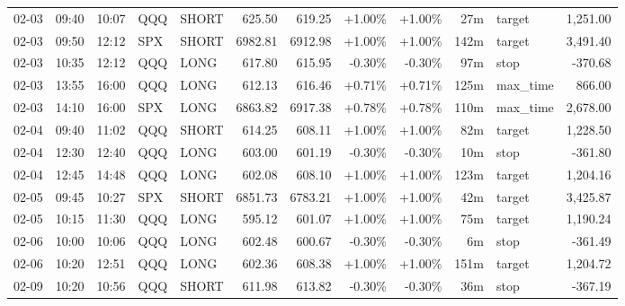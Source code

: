 \documentclass[11pt,a4paper,twoside]{article}
\begin{document}
\begin{center}
\begin{longtable}{>{\color{txtmain}}l l l l l r r r r r >{\color{txtmain}}l r}
02-03 & 09:40 & 10:07 & QQQ & SHORT & 625.50 & 619.25 & \textcolor{wingreen}{+1.00\%} & \textcolor{wingreen}{+1.00\%} & 27m & target & \textcolor{wingreen}{1,251.00} \\
02-03 & 09:50 & 12:12 & SPX & SHORT & 6982.81 & 6912.98 & \textcolor{wingreen}{+1.00\%} & \textcolor{wingreen}{+1.00\%} & 142m & target & \textcolor{wingreen}{3,491.40} \\
02-03 & 10:35 & 12:12 & QQQ & LONG & 617.80 & 615.95 & \textcolor{lossred}{-0.30\%} & \textcolor{lossred}{-0.30\%} & 97m & stop & \textcolor{lossred}{-370.68} \\
02-03 & 13:55 & 16:00 & QQQ & LONG & 612.13 & 616.46 & \textcolor{wingreen}{+0.71\%} & \textcolor{wingreen}{+0.71\%} & 125m & max\_time & \textcolor{wingreen}{866.00} \\
02-03 & 14:10 & 16:00 & SPX & LONG & 6863.82 & 6917.38 & \textcolor{wingreen}{+0.78\%} & \textcolor{wingreen}{+0.78\%} & 110m & max\_time & \textcolor{wingreen}{2,678.00} \\
02-04 & 09:40 & 11:02 & QQQ & SHORT & 614.25 & 608.11 & \textcolor{wingreen}{+1.00\%} & \textcolor{wingreen}{+1.00\%} & 82m & target & \textcolor{wingreen}{1,228.50} \\
02-04 & 12:30 & 12:40 & QQQ & LONG & 603.00 & 601.19 & \textcolor{lossred}{-0.30\%} & \textcolor{lossred}{-0.30\%} & 10m & stop & \textcolor{lossred}{-361.80} \\
02-04 & 12:45 & 14:48 & QQQ & LONG & 602.08 & 608.10 & \textcolor{wingreen}{+1.00\%} & \textcolor{wingreen}{+1.00\%} & 123m & target & \textcolor{wingreen}{1,204.16} \\
02-05 & 09:45 & 10:27 & SPX & SHORT & 6851.73 & 6783.21 & \textcolor{wingreen}{+1.00\%} & \textcolor{wingreen}{+1.00\%} & 42m & target & \textcolor{wingreen}{3,425.87} \\
02-05 & 10:15 & 11:30 & QQQ & LONG & 595.12 & 601.07 & \textcolor{wingreen}{+1.00\%} & \textcolor{wingreen}{+1.00\%} & 75m & target & \textcolor{wingreen}{1,190.24} \\
02-06 & 10:00 & 10:06 & QQQ & LONG & 602.48 & 600.67 & \textcolor{lossred}{-0.30\%} & \textcolor{lossred}{-0.30\%} & 6m & stop & \textcolor{lossred}{-361.49} \\
02-06 & 10:20 & 12:51 & QQQ & LONG & 602.36 & 608.38 & \textcolor{wingreen}{+1.00\%} & \textcolor{wingreen}{+1.00\%} & 151m & target & \textcolor{wingreen}{1,204.72} \\
02-09 & 10:20 & 10:56 & QQQ & SHORT & 611.98 & 613.82 & \textcolor{lossred}{-0.30\%} & \textcolor{lossred}{-0.30\%} & 36m & stop & \textcolor{lossred}{-367.19} \\

\end{longtable}
\end{center}
\end{document}
